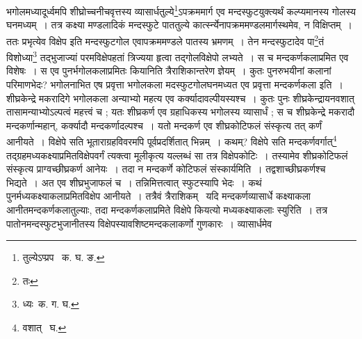 \documentclass[11pt, openany]{book}
\begin{document}
\noindent भगोलमध्यादूर्ध्वमपि शीघ्रोच्चनीचवृत्तस्य व्यासार्धतुल्ये\renewcommand{\thefootnote}{१}\footnote{तुल्येऽप्प्रप \textendash\ क. घ. ङ.}ऽपक्रममार्ग एव मन्दस्फुटयुक्त्यर्थं कल्प्यमानस्य गोलस्य घनमध्यम्~। तत्र कक्ष्या मण्डलादिकं मन्दस्फुटे पाततुल्ये कार्त्स्न्येनापक्रममण्डलमार्गस्थमेव, न विक्षिप्तम्~। ततः प्रभृत्येव विक्षेप इति मन्दस्फुटगोल एवापक्रममण्डले पातस्य भ्रमणम्~। तेन मन्दस्फुटादेव पा\renewcommand{\thefootnote}{२}\footnote{तः}तं विशोध्या\renewcommand{\thefootnote}{३}\footnote{ध्यः\textendash\ क. ग. घ.} तद्भुजाज्यां परमविक्षेपहतां त्रिज्यया हृत्वा 
तद्गोलविक्षेपो लभ्यते~। स च मन्दकर्णकलाप्रमित एव विशेषः~। स एव पुनर्भगोलकलाप्रमितः कियानिति त्रैराशिकान्तरेण ज्ञेयम्~। कुतः पुनरुभयीनां कलानां परिमाणभेदः? भगोलनाभित एष प्रवृत्ता भगोलकला मदस्फुटगोलघनमध्यत एव प्रवृत्ता मन्दकर्णकला इति~। शीघ्रकेन्द्रे मकरादिगे भगोलकला अन्याभ्यो महत्य एव कर्क्यादावल्पीयस्यश्च~। कुतः पुनः शीघ्रकेन्द्रायनवशात् तासामन्याभ्योऽल्पत्वं महत्त्वं च ; यतः शीघ्रकर्ण एव ग्रहाधिकस्य भगोलस्य व्यासार्धं ; स च शीघ्रकेन्द्रे मकरादौ मन्दकर्णान्महान्, कर्क्यादौ मन्दकर्णादल्पश्च~। यतो मन्दकर्ण 
एव शीघ्रकोटिफलं संस्कृत्य तत् कर्णं आनीयते~। विक्षेपे सति भूताराग्रहविवरमपि पूर्वप्रदर्शितात् भिन्नम्~। कथम्? 
विक्षेपे सति मन्दकर्णवर्गात्\renewcommand{\thefootnote}{४}\footnote{वशात् \textendash\ घ.} तद्ग्रहमध्यकक्ष्याप्रमितविक्षेपवर्गं त्यक्त्वा मूलीकृत्य यल्लब्धं सा तत्र विक्षेपकोटिः~। तस्यामेव शीघ्रकोटिफलं संस्कृत्य प्राग्वच्छीघ्रकर्ण आनेयः~। तदा न मन्दकर्णे कोटिफलं संस्कार्यमिति~। तद्वशाच्छीघ्रकर्णश्च भिद्यते~। अत एव शीघ्रभुजाफलं च~। तन्निमित्तत्वात् स्फुटस्यापि भेदः~। कथं पुनर्मध्यकक्ष्याकलाप्रमितविक्षेप आनीयते~। तत्रैवं त्रैराशिकम् \textendash\ यदि मन्दकर्णव्यासार्धे कक्ष्याकला आनीतमन्दकर्णकलातुल्याः, तदा मन्दकर्णकलाप्रमिते विक्षेपे कियत्यो मध्यकक्ष्याकलाः स्युरिति~। तत्र पातोनमन्दस्फुटभुजानीतस्य विक्षेपस्यावशिष्टमन्दकलाकर्णो गुणकारः~। व्यासार्धमेव 
\newpage
\end{document}
